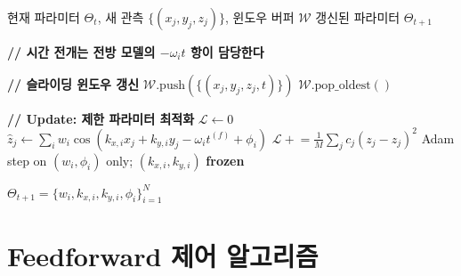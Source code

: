 \documentclass[11pt]{report}
\numberwithin{equation}{chapter}
\numberwithin{figure}{chapter}
\numberwithin{table}{chapter}
\newcommand{\WS}{\textsc{WaveSplat}}
\begin{document}
\begin{algorithm}[H]
\caption{\WS{} 프레임별 추적 알고리즘 (\texttt{w\_phi} 모드)}
\label{alg:tracking}
\begin{algorithmic}[1]
\REQUIRE 현재 파라미터 $\Theta_t$, 새 관측 $\{(x_j, y_j, z_j)\}$, 윈도우 버퍼 $\mathcal{W}$
\ENSURE 갱신된 파라미터 $\Theta_{t+1}$

\STATE \textbf{// 시간 전개는 전방 모델의 $-\omega_i t$ 항이 담당한다}
\STATE {}

\STATE \textbf{// 슬라이딩 윈도우 갱신}
\STATE $\mathcal{W}.\text{push}(\{(x_j, y_j, z_j, t)\})$
  \STATE $\mathcal{W}.\text{pop\_oldest}()$
\ENDIF

\STATE \textbf{// Update: 제한 파라미터 최적화}
  \STATE $\mathcal{L} \leftarrow 0$
    \STATE $\hat{z}_j \leftarrow \sum_i w_i \cos(k_{x,i}x_j + k_{y,i}y_j - \omega_i t^{(f)} + \phi_i)$
    \STATE $\mathcal{L} \mathrel{+}= \frac{1}{M}\sum_j c_j(z_j - \hat{z}_j)^2$
  \ENDFOR
  \STATE Adam step on $(w_i, \phi_i)$ only; $(k_{x,i}, k_{y,i})$ \textbf{frozen}
  \STATE {}
\ENDFOR

\RETURN $\Theta_{t+1} = \{w_i, k_{x,i}, k_{y,i}, \phi_i\}_{i=1}^N$
\end{algorithmic}
\end{algorithm}

\section{Feedforward 제어 알고리즘}
\label{app:alg_ff}
\end{document}
